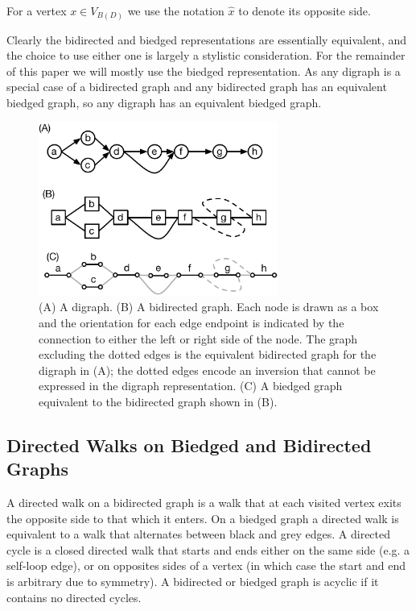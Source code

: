 \documentclass[11pt]{ucthesis}
\begin{document}
For a vertex $x \in V_{B(D)}$ we use the notation $\hat{x}$ to denote its opposite side.

Clearly the bidirected and biedged representations are essentially equivalent, and the choice to use either one is largely a stylistic consideration. For the remainder of this paper we will mostly use the biedged representation. As any digraph is a special case of a bidirected graph and any bidirected graph has an equivalent biedged graph, so any digraph has an equivalent biedged graph.

\begin{figure}
\centering
\includegraphics[width=0.7\textwidth]{snarlfigures/fig1.pdf}
\caption{\label{fig:digraphs_and_bigraphs} (A) A digraph.
(B) A bidirected graph. Each node is drawn as a box and the orientation for each edge endpoint is indicated by the connection to either the left or right side of the node. The graph excluding the dotted edges is the equivalent bidirected graph for the digraph in (A); the dotted edges encode an inversion that cannot be expressed in the digraph representation. (C) A biedged graph equivalent to the bidirected graph shown in (B).}
\end{figure}

\subsection{Directed Walks on Biedged and Bidirected Graphs}

A directed walk on a bidirected graph is a walk that at each visited vertex exits the opposite side to that which it enters. On a biedged graph a directed walk is equivalent to a walk that alternates between black and grey edges. A directed cycle is a closed directed walk that starts and ends either on the same side (e.g. a self-loop edge), or on opposites sides of a vertex (in which case the start and end is arbitrary due to symmetry). A bidirected or biedged graph is acyclic if it contains no directed cycles. 
\end{document}
